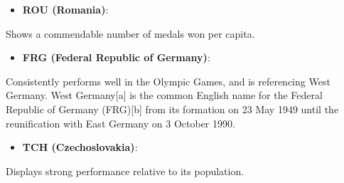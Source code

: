 \documentclass[
  12pt,
]{elsarticle}
\providecommand{\tightlist}{%
  \setlength{\itemsep}{0pt}\setlength{\parskip}{0pt}}
\begin{document}
\begin{itemize}
\tightlist
\item
  \textbf{ROU (Romania)}:
\end{itemize}

Shows a commendable number of medals won per capita.

\begin{itemize}
\tightlist
\item
  \textbf{FRG (Federal Republic of Germany)}:
\end{itemize}

Consistently performs well in the Olympic Games, and is referencing West
Germany. West Germany{[}a{]} is the common English name for the Federal
Republic of Germany (FRG){[}b{]} from its formation on 23 May 1949 until
the reunification with East Germany on 3 October 1990.

\begin{itemize}
\tightlist
\item
  \textbf{TCH (Czechoslovakia)}:
\end{itemize}

Displays strong performance relative to its population.
\end{document}
